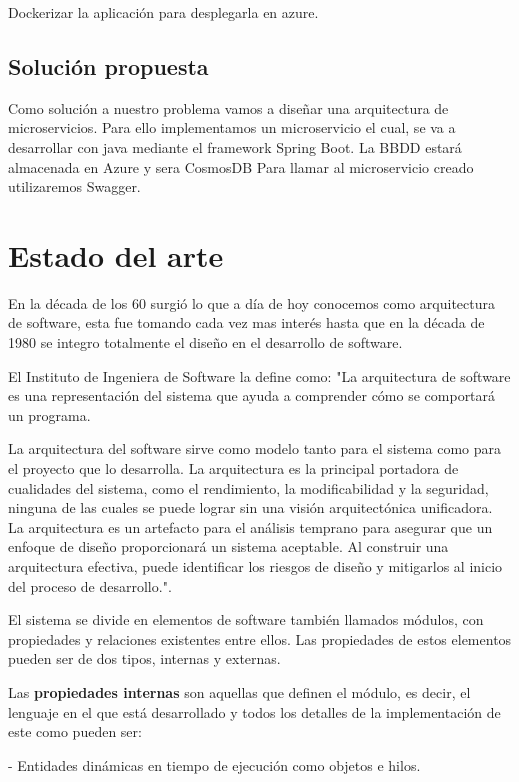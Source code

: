 \documentclass[12pt]{report} %
\begin{document}
	Dockerizar la aplicación para desplegarla en azure.
		
	\section{Solución propuesta}
	Como solución a nuestro problema vamos a diseñar una arquitectura de microservicios.
	Para ello implementamos un microservicio el cual, se va a desarrollar con java mediante el framework Spring Boot.
	La BBDD estará almacenada en Azure y sera CosmosDB
	Para llamar al microservicio creado utilizaremos Swagger.
	 
	\chapter{Estado del arte}

	En la década de los 60 surgió lo que a día de hoy conocemos como arquitectura de software, esta fue tomando cada vez mas interés hasta que en la década de 1980 se integro totalmente el diseño en el desarrollo de software. 
	
	El Instituto de Ingeniera de Software la define como:
	"La arquitectura de software es una representación del sistema que ayuda a comprender cómo se comportará un programa. 
	
	La arquitectura del software sirve como modelo tanto para el sistema como para el proyecto que lo desarrolla. La arquitectura es la principal portadora de cualidades del sistema, como el rendimiento, la modificabilidad y la seguridad, ninguna de las cuales se puede lograr sin una visión arquitectónica unificadora. La arquitectura es un artefacto para el análisis temprano para asegurar que un enfoque de diseño proporcionará un sistema aceptable. Al construir una arquitectura efectiva, puede identificar los riesgos de diseño y mitigarlos al inicio del proceso de desarrollo."\cite{SoftwareEngineeringInstitute}. 
	
	El sistema se divide en elementos de software también llamados módulos, con propiedades y relaciones existentes entre ellos. Las propiedades de estos elementos pueden ser de dos tipos, internas y externas.
	
	Las \textbf{propiedades internas}  son aquellas que definen el módulo, es decir, el lenguaje en el que está desarrollado y todos los detalles de la implementación de este como pueden ser:
	
	- Entidades dinámicas en tiempo de ejecución como objetos e hilos.
	
\end{document}
